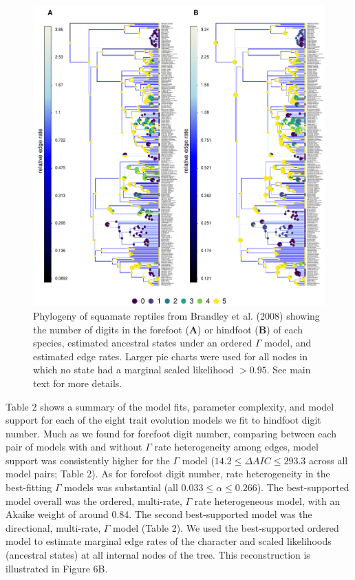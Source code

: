 \documentclass[fleqn,10pt,lineno]{wlpeerj} %
\begin{document}
\begin{figure}
\includegraphics[width=1\linewidth]{Revell-and-Harmon.fitgammaMk.PeerJ_files/figure-latex/unnamed-chunk-16-1} \caption{Phylogeny of squamate reptiles from Brandley et al. (2008) showing the number of digits in the forefoot (\textbf{A}) or hindfoot (\textbf{B}) of each species, estimated ancestral states under an ordered $\Gamma$ model, and estimated edge rates. Larger pie charts were used for all nodes in which no state had a marginal scaled likelihood $> 0.95$. See main text for more details.}\label{fig:unnamed-chunk-16}
\end{figure}

Table 2 shows a summary of the model fits, parameter complexity, and model support for each of the eight trait evolution models we fit to hindfoot digit number. Much as we found for forefoot digit number, comparing between each pair of models with and without \(\Gamma\) rate heterogeneity among edges, model support was consistently higher for the \(\Gamma\) model (\(14.2 \le \Delta AIC \le 293.3\) across all model pairs; Table 2). As for forefoot digit number, rate heterogeneity in the best-fitting \(\Gamma\) models was substantial (all \(0.033 \le \alpha \le 0.266\)). The best-supported model overall was the ordered, multi-rate, \(\Gamma\) rate heterogeneous model, with an Akaike weight of around 0.84. The second best-supported model was the directional, multi-rate, \(\Gamma\) model (Table 2). We used the best-supported ordered model to estimate marginal edge rates of the character and scaled likelihoods (ancestral states) at all internal nodes of the tree. This reconstruction is illustrated in Figure 6B.
\end{document}
